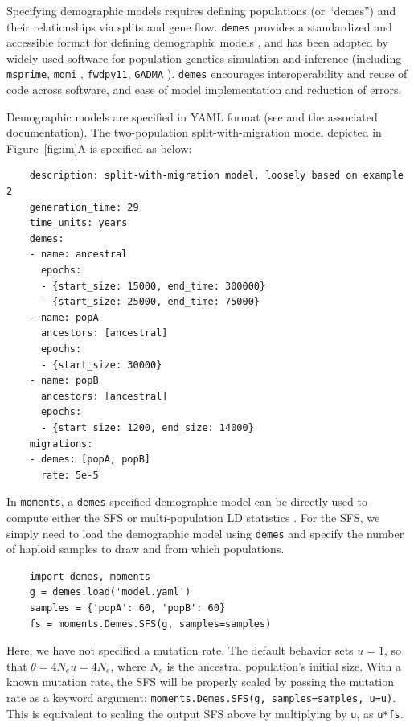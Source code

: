 \documentclass[]{article}
\newcommand{\moments}{\texttt{moments}\xspace}
\newcommand{\demes}{\texttt{demes}\xspace}
\newcommand{\msprime}{\texttt{msprime}\xspace}
\newcommand{\momi}{\texttt{momi}\xspace}
\newcommand{\fwdpy}{\texttt{fwdpy11}\xspace}
\begin{document}
Specifying demographic models requires defining populations (or ``demes'') and
their relationships via splits and gene flow. \demes provides a standardized
and accessible format for defining demographic models \citep{gower2022demes},
and has been adopted by widely used software for population genetics simulation
and inference (including \msprime \citep{baumdicker2022efficient}, \momi
\citep{dilber2024faster}, \fwdpy \citep{thornton2019polygenic}, \texttt{GADMA}
\citep{noskova2023gadma2}). \demes encourages interoperability and reuse of
code across software, and ease of model implementation and reduction of errors.

Demographic models are specified in YAML format (see \citet{gower2022demes} and
the associated documentation). The two-population split-with-migration model
depicted in Figure~\ref{fig:im}A is specified as below:
\begin{verbatim}
    description: split-with-migration model, loosely based on example 2
    generation_time: 29
    time_units: years
    demes:
    - name: ancestral
      epochs:
      - {start_size: 15000, end_time: 300000}
      - {start_size: 25000, end_time: 75000}
    - name: popA
      ancestors: [ancestral]
      epochs:
      - {start_size: 30000}
    - name: popB
      ancestors: [ancestral]
      epochs:
      - {start_size: 1200, end_size: 14000}
    migrations:
    - demes: [popA, popB]
      rate: 5e-5
\end{verbatim}

In \moments, a \demes-specified demographic model can be directly used to
compute either the SFS or multi-population LD statistics
\citep{ragsdale2019models, ragsdale2020unbiased}. For the SFS, we simply need
to load the demographic model using \demes and specify the number of haploid
samples to draw and from which populations.
\begin{verbatim}
    import demes, moments
    g = demes.load('model.yaml')
    samples = {'popA': 60, 'popB': 60}
    fs = moments.Demes.SFS(g, samples=samples)
\end{verbatim}
Here, we have not specified a mutation rate. The default behavior sets $u=1$,
so that $\theta = 4N_eu=4N_e$, where $N_e$ is the ancestral population's
initial size. With a known mutation rate, the SFS will be properly scaled by
passing the mutation rate as a keyword argument: \texttt{moments.Demes.SFS(g,
samples=samples, u=u)}. This is equivalent to scaling the output SFS above by
multiplying by \texttt{u}, as \texttt{u*fs}.
\end{document}
